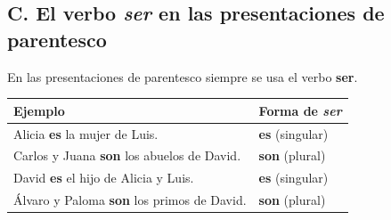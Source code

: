 \documentclass[a4paper,11pt]{article}
\begin{document}
\vspace{0.5cm}


\subsection*{\textcolor{violeta}{C. El verbo \textit{ser} en las presentaciones de parentesco}}

En las presentaciones de parentesco siempre se usa el verbo \textbf{ser}.

\vspace{0.3cm}

\begin{center}
\renewcommand{\arraystretch}{1.5}
\begin{tabular}{|>{\centering\arraybackslash}p{7cm}|>{\centering\arraybackslash}p{3cm}|}
\hline
\rowcolor{violeta!10}
\textbf{Ejemplo} & \textbf{Forma de \textit{ser}} \\
\hline
Alicia \textbf{es} la mujer de Luis. & \textbf{es} (singular) \\
\hline
Carlos y Juana \textbf{son} los abuelos de David. & \textbf{son} (plural) \\
\hline
David \textbf{es} el hijo de Alicia y Luis. & \textbf{es} (singular) \\
\hline
Álvaro y Paloma \textbf{son} los primos de David. & \textbf{son} (plural) \\
\hline
\end{tabular}
\end{center}

\vspace{0.5cm}

\begin{center}
\end{center}
\end{document}
